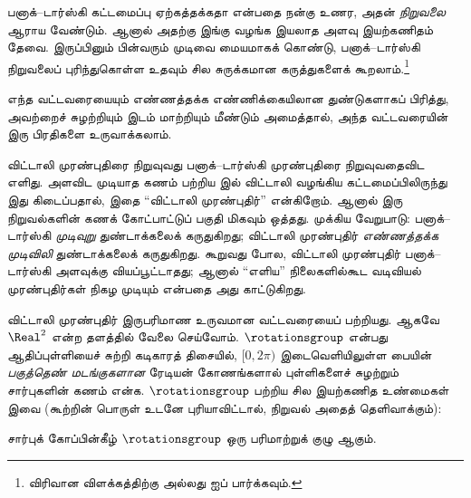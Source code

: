 \documentclass[../../../include/open-logic-section]{subfiles}
\begin{document}

பனாக்--டார்ஸ்கி கட்டமைப்பு ஏற்கத்தக்கதா என்பதை நன்கு
உணர, அதன் \emph{நிறுவலை} ஆராய வேண்டும். ஆனால் அதற்கு
இங்கு வழங்க இயலாத அளவு இயற்கணிதம் தேவை. இருப்பினும்
பின்வரும் முடிவை மையமாகக் கொண்டு, பனாக்--டார்ஸ்கி
நிறுவலைப் புரிந்துகொள்ள உதவும் சில சுருக்கமான கருத்துகளைக்
கூறலாம்.\footnote{விரிவான விளக்கத்திற்கு \cite{Weston2003}
அல்லது \cite{Wagon2016} ஐப் பார்க்கவும்.}

\begin{thm}[விட்டாலி முரண்புதிர் ($\ZFC$ இல்)]
எந்த வட்டவரையையும் எண்ணத்தக்க எண்ணிக்கையிலான துண்டுகளாகப்
பிரித்து, அவற்றைச் சுழற்றியும் இடம் மாற்றியும் மீண்டும்
அமைத்தால், அந்த வட்டவரையின் இரு பிரதிகளை உருவாக்கலாம்.
\end{thm}

விட்டாலி முரண்புதிரை நிறுவுவது பனாக்--டார்ஸ்கி முரண்புதிரை
நிறுவுவதைவிட எளிது. அளவிட முடியாத கணம் பற்றிய
\citeyear{Vitali1905} இல் விட்டாலி வழங்கிய கட்டமைப்பிலிருந்து
இது கிடைப்பதால், இதை ``விட்டாலி முரண்புதிர்'' என்கிறோம்.
ஆனால் இரு நிறுவல்களின் கணக் கோட்பாட்டுப் பகுதி மிகவும்
ஒத்தது. முக்கிய வேறுபாடு: பனாக்--டார்ஸ்கி \emph{முடிவுறு}
துண்டாக்கலைக் கருதுகிறது; விட்டாலி முரண்புதிர்
\emph{எண்ணத்தக்க முடிவிலி} துண்டாக்கலைக் கருதுகிறது.
\citet{Weston2003} கூறுவது போல, விட்டாலி முரண்புதிர்
பனாக்--டார்ஸ்கி அளவுக்கு வியப்பூட்டாதது; ஆனால் ``எளிய''
நிலைகளில்கூட வடிவியல் முரண்புதிர்கள் நிகழ முடியும் என்பதை
அது காட்டுகிறது.

விட்டாலி முரண்புதிர் இருபரிமாண உருவமான வட்டவரையைப்
பற்றியது. ஆகவே $\Real^2$ என்ற தளத்தில் வேலை செய்வோம்.
$\rotationsgroup$ என்பது ஆதிப்புள்ளியைச் சுற்றி கடிகாரத்
திசையில், $[0,2\pi)$ இடைவெளியிலுள்ள பையின்
\emph{பகுத்தெண் மடங்குகளான} ரேடியன் கோணங்களால் புள்ளிகளைச்
சுழற்றும் சார்புகளின் கணம் என்க. $\rotationsgroup$ பற்றிய
சில இயற்கணித உண்மைகள் இவை (கூற்றின் பொருள் உடனே
புரியாவிட்டால், நிறுவல் அதைத் தெளிவாக்கும்):

\begin{lem}
சார்புக் கோப்பின்கீழ் $\rotationsgroup$ ஒரு பரிமாற்றுக்
{குழு} ஆகும்.
\end{lem}
\end{document}
